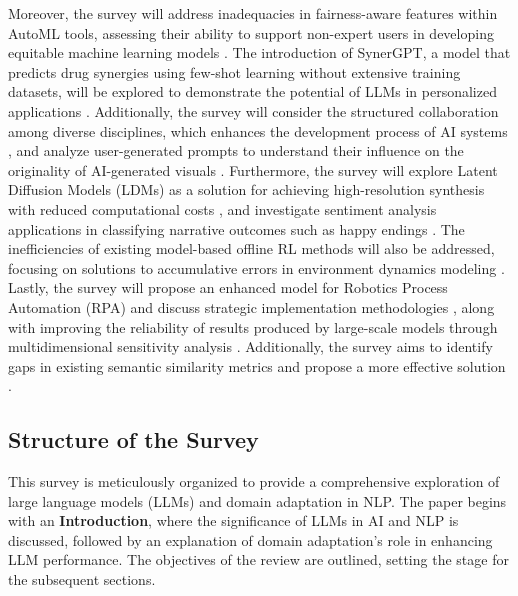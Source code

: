 Moreover, the survey will address inadequacies in fairness-aware features within AutoML tools, assessing their ability to support non-expert users in developing equitable machine learning models \cite{narayanan2023democratizecareneedfairness}. The introduction of SynerGPT, a model that predicts drug synergies using few-shot learning without extensive training datasets, will be explored to demonstrate the potential of LLMs in personalized applications \cite{edwards2023synergptincontextlearningpersonalized}. Additionally, the survey will consider the structured collaboration among diverse disciplines, which enhances the development process of AI systems \cite{korre2023takesvillagemultidisciplinaritycollaboration}, and analyze user-generated prompts to understand their influence on the originality of AI-generated visuals \cite{palmini2024patternscreativityuserinput}. Furthermore, the survey will explore Latent Diffusion Models (LDMs) as a solution for achieving high-resolution synthesis with reduced computational costs \cite{rombach2022high}, and investigate sentiment analysis applications in classifying narrative outcomes such as happy endings \cite{jannidis2016analyzingfeaturesdetectionhappy}. The inefficiencies of existing model-based offline RL methods will also be addressed, focusing on solutions to accumulative errors in environment dynamics modeling \cite{wang2023environmenttransformerpolicyoptimization}. Lastly, the survey will propose an enhanced model for Robotics Process Automation (RPA) and discuss strategic implementation methodologies \cite{pandy2024advancementsroboticsprocessautomation}, along with improving the reliability of results produced by large-scale models through multidimensional sensitivity analysis \cite{dimov2017multidimensionalsensitivityanalysislargescale}. Additionally, the survey aims to identify gaps in existing semantic similarity metrics and propose a more effective solution \cite{yamshchikov2020styletransferparaphraselookingsensible}.



\subsection{Structure of the Survey} \label{subsec:Structure of the Survey}



This survey is meticulously organized to provide a comprehensive exploration of large language models (LLMs) and domain adaptation in NLP. The paper begins with an \textbf{Introduction}, where the significance of LLMs in AI and NLP is discussed, followed by an explanation of domain adaptation's role in enhancing LLM performance. The objectives of the review are outlined, setting the stage for the subsequent sections.



